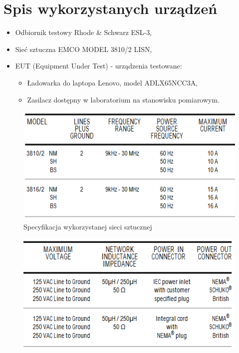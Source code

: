 \documentclass[12pt, a4paper, oneside]{article}
\begin{document}
\section{Spis wykorzystanych urządzeń}
\begin{itemize}
\item Odbiornik testowy Rhode \& Schwarz ESL-3,
\item Sieć sztuczna EMCO MODEL 3810/2 LISN,
\item EUT (Equipment Under Test) - urządzenia testowane:
\begin{itemize}
\item Ładowarka do laptopa Lenovo, model ADLX65NCC3A,
\item Zasilacz dostępny w laboratorium na stanowisku pomiarowym.
\end{itemize}
\end{itemize}
\begin{figure}[h!]
\centering
\caption{Specyfikacja wykorzystanej sieci sztucznej}
\includegraphics[scale=0.5]{f2.png}
\end{figure}
\begin{figure}[h!]
\centering
\includegraphics[scale=0.5]{f3.png}
\end{figure}
\end{document}
